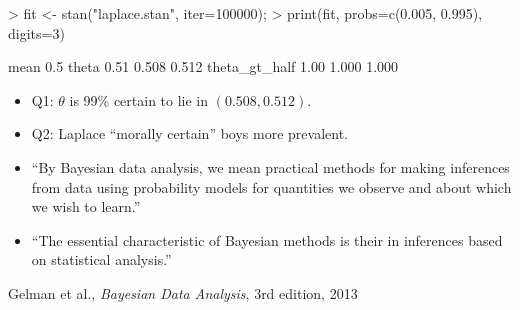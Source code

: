 \documentclass[10pt]{report}
\begin{document}
%
\begin{codein}
> fit <- stan("laplace.stan", iter=100000);
> print(fit, probs=c(0.005, 0.995), digits=3)
\end{codein}
\begin{codeout}
                    mean   0.5%
theta               0.51  0.508  0.512
theta_gt_half       1.00  1.000  1.000
\end{codeout}
%
\begin{itemize}
\item Q1: $\theta$ is 99\% certain to lie in $(0.508, 0.512)$.
%
\item Q2:  Laplace ``morally certain'' boys more prevalent.
\end{itemize}





%
\begin{itemize}
\item ``By {Bayesian data analysis}, we mean {practical methods}
  for making {inferences} from {data} using {probability models}
  for quantities we {observe} and about which we {wish to learn}.''
\item ``The essential characteristic of Bayesian methods is
  their 
  in inferences based on statistical analysis.''
\end{itemize}
%
\vfill\hfill{\footnotesize Gelman et al., {\slshape Bayesian Data Analysis},
  3rd edition, 2013}
\end{document}
